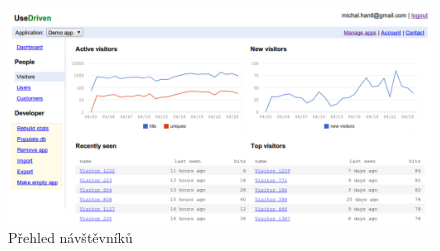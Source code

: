 \documentclass[bc,male,java,dept456]{diploma}						%
\begin{document}

\begin{figure}[h]
	\centering
	\includegraphics[width=15cm]{img/ud_visitors_2.pdf}
	\caption{Přehled návštěvníků}
	\label{img:ud_dashboard}
\end{figure}
\end{document}
